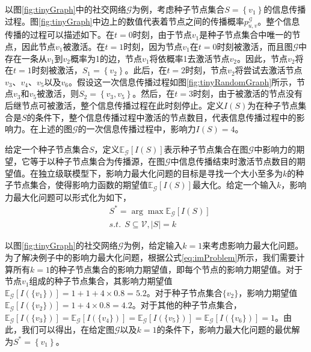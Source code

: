 以图\ref{fig:tinyGraph}中的社交网络$\mathcal{G}$为例，考虑种子节点集合$S=\left\{v_1\right\}$的信息传播过程。图\ref{fig:tinyGraph}中边上的数值代表着节点之间的传播概率$p^\mathcal{G}_{u,v}$。整个信息传播的过程可以描述如下。在$t=0$时刻，由于节点$v_1$是种子节点集合中唯一的节点，因此节点$v_1$被激活。在$t=1$时刻，因为节点$v_1$在$t=0$时刻被激活，而且图$\mathcal{G}$中存在一条从$v_1$到$v_2$概率为1的边，节点$v_1$将依概率1去激活节点$v_2$。因此，节点$v_2$将在$t=1$时刻被激活，$S_1=\left\{v_2\right\}$。此后，在$t=2$时刻，节点$v_2$将尝试去激活节点$v_3$、$v_4$、$v_5$以及$v_6$。假设这一次信息传播过程如图\ref{fig:tinyRandomGraph}所示，节点$v_3$和$v_5$被激活，则$S_2=\left\{v_3, v_5\right\}$。然后，在$t=3$时刻，由于被激活的节点没有后继节点可被激活，整个信息传播过程在此时刻停止。定义$I\left(S\right)$为在种子节点集合是$S$的条件下，整个信息传播过程中激活的节点数目，代表信息传播过程中的影响力。在上述的图$\mathcal{G}$的一次信息传播过程中，影响力$I\left(S\right)=4$。

给定一个种子节点集合$S$，定义$\mathbb{E}_\mathcal{G}\left[I\left(S\right)\right]$表示种子节点集合在图$\mathcal{G}$中影响力的期望，它等于以种子节点集合为传播源，在图$\mathcal{G}$中信息传播结束时激活节点数目的期望值。在独立级联模型下，影响力最大化问题的目标是寻找一个大小至多为$k$的种子节点集合，使得影响力函数的期望值$\mathbb{E}_\mathcal{G}\left[I\left(S\right)\right]$最大化。给定一个输入$k$，影响力最大化问题可以形式化为如下，
\begin{equation}\label{eq:imProblem}
    \begin{split}
        &S^{\ast} = \arg\max{\mathbb{E}_\mathcal{G}\left[I\left(S\right)\right]}\\
        &s.t.~~S \subseteq \mathcal{V},\left\vert{S}\right\vert = k
    \end{split}
\end{equation}

以图\ref{fig:tinyGraph}的社交网络$\mathcal{G}$为例，给定输入$k=1$来考虑影响力最大化问题。为了解决例子中的影响力最大化问题，根据公式\ref{eq:imProblem}所示，我们需要计算所有$k=1$的种子节点集合的影响力期望值，即每个节点的影响力期望值。对于节点$v_1$组成的种子节点集合，其影响力期望值$\mathbb{E}_\mathcal{G}\left[I\left(\{v_1\}\right)\right]=1+1+4\times0.8=5.2$。对于种子节点集合$\{v_2\}$，影响力期望值$\mathbb{E}_\mathcal{G}\left[I\left(\{v_2\}\right)\right]=1+4\times0.8=4.2$。对于其他的种子节点集合，$\mathbb{E}_\mathcal{G}\left[I\left(\{v_3\}\right)\right]=
\mathbb{E}_\mathcal{G}\left[I\left(\{v_4\}\right)\right]=
\mathbb{E}_\mathcal{G}\left[I\left(\{v_5\}\right)\right]=
\mathbb{E}_\mathcal{G}\left[I\left(\{v_6\}\right)\right]=1$。由此，我们可以得出，在给定图$\mathcal{G}$以及$k=1$的条件下，影响力最大化问题的最优解为$S^\ast=\left\{v_1\right\}$。

